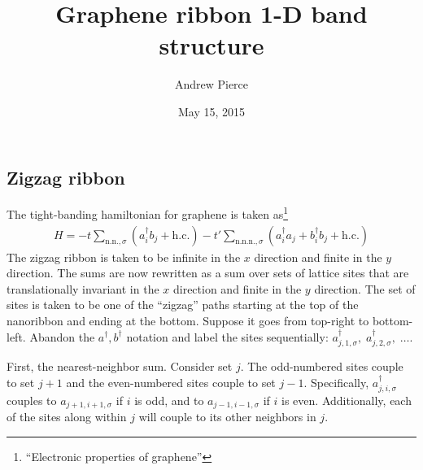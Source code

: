 \documentclass{article}
\title{Graphene ribbon 1-D band structure}
\author{Andrew Pierce}
\date{May 15, 2015}
\newcommand{\ies}[1]{ \begin{equation*} \begin{split} #1 \end{split} \end{equation*}}
\newcommand{\hc}{\text{h.c.}}
\begin{document}
\maketitle

\subsection*{Zigzag ribbon}
The tight-banding hamiltonian for graphene is taken as\footnote{``Electronic properties of graphene''} 
\ies{
  H = -t \sum_{\text{n.n.}, \sigma} 
  \left( a^\dagger_i b_j + \hc \right)
  - t' \sum_{\text{n.n.n.}, \sigma} 
  \left( a^\dagger_i a_j + b^\dagger_i b_j + \hc \right)
}
The zigzag ribbon is taken to be infinite in the $x$ direction and finite in the $y$ direction. The sums are now rewritten as a sum over sets of lattice sites that are translationally invariant in the $x$ direction and finite in the $y$ direction. The set of sites is taken to be one of the ``zigzag'' paths starting at the top of the nanoribbon and ending at the bottom. Suppose it goes from top-right to bottom-left. Abandon the $a^\dagger, b^\dagger$ notation and label the sites sequentially: $a^\dagger_{j, 1, \sigma}, \;  a^\dagger_{j,2, \sigma}, \; \ldots$.

First, the nearest-neighbor sum. Consider set $j$. The odd-numbered sites couple to set $j+1$ and the even-numbered sites couple to set $j-1$. Specifically, $a^\dagger_{j, i, \sigma}$ couples to $a_{j+1, i+1, \sigma}$ if $i$ is odd, and to $a_{j-1, i-1, \sigma}$ if $i$ is even. Additionally, each of the sites along within $j$ will couple to its other neighbors in $j$. 
\end{document}
